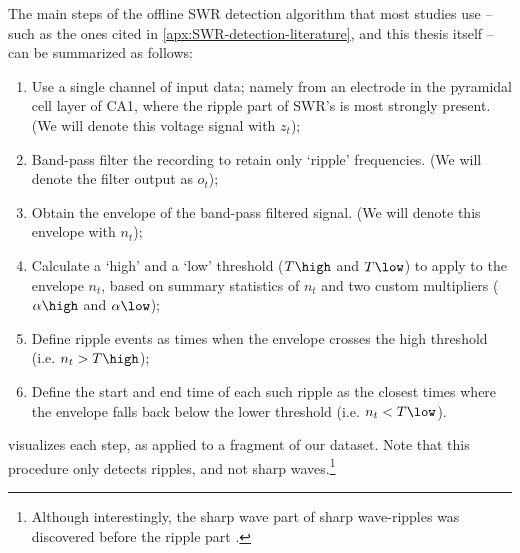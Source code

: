 The main steps of the offline SWR detection algorithm that most studies use -- such as the ones cited in \cref{apx:SWR-detection-literature}, and this thesis itself -- can be summarized as follows:
\begin{enumerate}
\item Use a single channel of input data; namely from an electrode in the pyramidal cell layer of CA1, where the ripple part of SWR's is most strongly present. (We will denote this voltage signal with $z_t$);
\item Band-pass filter the recording to retain only `ripple' frequencies. (We will denote the filter output as $o_t$);
\item Obtain the envelope of the band-pass filtered signal. (We will denote this envelope with $n_t$);
\item Calculate a `high' and a `low' threshold ($T\high$ and $T\low$) to apply to the envelope $n_t$, based on summary statistics of $n_t$ and two custom multipliers ($\alpha\high$ and $\alpha\low$);
\item Define ripple events as times when the envelope crosses the high threshold (i.e. $n_t > T\high$);
\item Define the start and end time of each such ripple as the closest times where the envelope falls back below the lower threshold (i.e. $n_t < T\low$).
\end{enumerate}

 visualizes each step, as applied to a fragment of our dataset. Note that this procedure only detects ripples, and not sharp waves.\footnote{Although interestingly, the sharp wave part of sharp wave-ripples was discovered before the ripple part \cite[p. 1]{Buzsaki2015}.}

